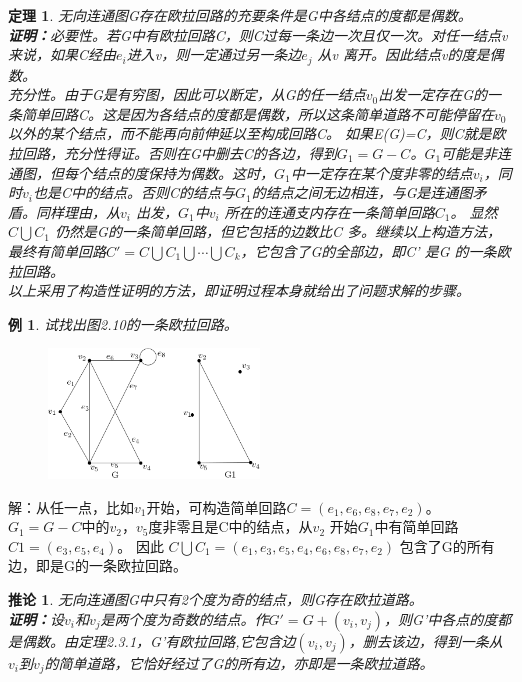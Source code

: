 \documentclass[11pt,a4paper,openany]{book}
\newtheorem{theorem}{\textbf{定理}}[section]
\newtheorem{coro}{\textbf{推论}}[section]
\newtheorem{sample}{\textbf{例}}[section]
\begin{document}
\begin{theorem}
无向连通图G存在欧拉回路的充要条件是G中各结点的度都是偶数。\\
\textbf{证明：}必要性。若G中有欧拉回路C，则C过每一条边一次且仅一次。对任一结点v来说，如果C经由$e_i$进入v，则一定通过另一条边$e_j$ 从v 离开。因此结点v的度是偶数。\\
充分性。由于G是有穷图，因此可以断定，从G的任一结点$v_0$出发一定存在G的一条简单回路C。这是因为各结点的度都是偶数，所以这条简单道路不可能停留在$v_0$以外的某个结点，而不能再向前伸延以至构成回路C。
如果E(G)=C，则C就是欧拉回路，充分性得证。否则在G中删去C的各边，得到$G_1=G-C$。$G_1$可能是非连通图，但每个结点的度保持为偶数。这时，$G_1$中一定存在某个度非零的结点$v_i$，同时$v_i$也是C中的结点。否则C的结点与$G_1$的结点之间无边相连，与G是连通图矛盾。同样理由，从$v_i$ 出发，$G_1$中$v_i$ 所在的连通支内存在一条简单回路$C_1$。 显然$C\bigcup C_1$ 仍然是G的一条简单回路，但它包括的边数比C 多。继续以上构造方法，最终有简单回路$C'=C\bigcup C_1\bigcup\cdots\bigcup C_k$，它包含了G的全部边，即C' 是G 的一条欧拉回路。\\
以上采用了构造性证明的方法，即证明过程本身就给出了问题求解的步骤。
\end{theorem}
\begin{sample}
试找出图2.10的一条欧拉回路。
\end{sample}
\begin{figure}[h]
  \centering
  \includegraphics[width=0.5\textwidth]{2.10.png}\\
  \caption{}
\end{figure}
\indent 解：从任一点，比如$v_1$开始，可构造简单回路$C=(e_1,e_6,e_8,e_7,e_2)$。$G_1  =G-C$中的$v_2，v_5$度非零且是C中的结点，从$v_2$ 开始$G_1$中有简单回路$C1=(e_3,e_5,e_4)$。 因此 $C\bigcup C_1=(e_1,e_3,e_5,e_4,e_6,e_8,e_7,e_2)$ 包含了G的所有边，即是G的一条欧拉回路。
\begin{coro}
无向连通图G中只有2个度为奇的结点，则G存在欧拉道路。\\
\textbf{证明：}设$v_i$和$v_j$是两个度为奇数的结点。作$G'=G+(v_i,v_j)$，则G'中各点的度都是偶数。由定理2.3.1，G'有欧拉回路,它包含边$(v_i,v_j)$，删去该边，得到一条从$v_i$到$v_j$的简单道路，它恰好经过了G的所有边，亦即是一条欧拉道路。
\end{coro}
\end{document}
